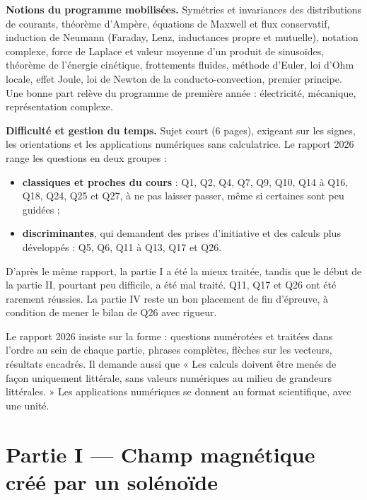 \documentclass[11pt,a4paper]{article}
\providecommand{\tightlist}{\setlength{\itemsep}{0pt}\setlength{\parskip}{0pt}}
\begin{document}
\textbf{Notions du programme mobilisées.} Symétries et invariances des distributions de courants, théorème d'Ampère, équations de Maxwell et flux conservatif, induction de Neumann (Faraday, Lenz, inductances propre et mutuelle), notation complexe, force de Laplace et valeur moyenne d'un produit de sinusoïdes, théorème de l'énergie cinétique, frottements fluides, méthode d'Euler, loi d'Ohm locale, effet Joule, loi de Newton de la conducto-convection, premier principe. Une bonne part relève du programme de première année : électricité, mécanique, représentation complexe.

\textbf{Difficulté et gestion du temps.} Sujet court (6 pages), exigeant sur les signes, les orientations et les applications numériques sans calculatrice. Le rapport 2026 range les questions en deux groupes :

\begin{itemize}
\tightlist
\item
  \textbf{classiques et proches du cours} : Q1, Q2, Q4, Q7, Q9, Q10, Q14 à Q16, Q18, Q24, Q25 et Q27, à ne pas laisser passer, même si certaines sont peu guidées ;
\item
  \textbf{discriminantes}, qui demandent des prises d'initiative et des calculs plus développés : Q5, Q6, Q11 à Q13, Q17 et Q26.
\end{itemize}

D'après le même rapport, la partie I a été la mieux traitée, tandis que le début de la partie II, pourtant peu difficile, a été mal traité. Q11, Q17 et Q26 ont été rarement réussies. La partie IV reste un bon placement de fin d'épreuve, à condition de mener le bilan de Q26 avec rigueur.

\begin{jury}

Le rapport 2026 insiste sur la forme : questions numérotées et traitées dans l'ordre au sein de chaque partie, phrases complètes, flèches sur les vecteurs, résultats encadrés. Il demande aussi que « Les calculs doivent être menés de façon uniquement littérale, sans valeurs numériques au milieu de grandeurs littérales. » Les applications numériques se donnent au format scientifique, avec une unité.

\end{jury}

\hypertarget{partie-i-champ-magnuxe9tique-cruxe9uxe9-par-un-soluxe9nouxefde}{%
\section{Partie I --- Champ magnétique créé par un solénoïde}\label{partie-i-champ-magnuxe9tique-cruxe9uxe9-par-un-soluxe9nouxefde}}
\end{document}
